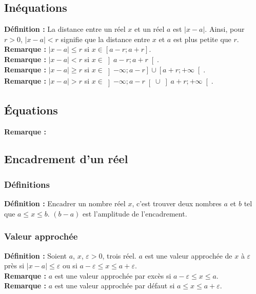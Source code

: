 \documentclass[a4paper,titlepage]{article}
\makeatletter
\def\tikzscale{1}\begin{lrbox}{\measure@tikzpicture}
\edef\tikzscale{\pgfmathresult}
\makeatother
\begin{document}
    \subsection{Inéquations}
        \textbf{Définition :} La distance entre un réel $x$ et un réel $a$ est $\left|x-a\right|$. Ainsi, pour $r>0$, $\left|x-a\right|<r$ signifie que la distance entre $x$ et $a$ est plus petite que $r$.
        \\
        \textbf{Remarque :} $\left|x-a\right|\leqslant r$ si $x\in\left[a-r;a+r\right]$.
        \\
        \textbf{Remarque :} $\left|x-a\right|<r$ si $x\in\left]a-r;a+r\right[$.
        \\
        \textbf{Remarque :} $\left|x-a\right|\geqslant r$ si $x\in\left]-\infty;a-r\right]\cup\left[a+r;+\infty\right[$.
        \\
        \textbf{Remarque :} $\left|x-a\right|>r$ si $x\in\left]-\infty;a-r\right[\cup\left]a+r;+\infty\right[$.
    \subsection{Équations}
        \textbf{Remarque :}\\
        \begin{scaletikzpicturetowidth}{\textwidth}
        \end{scaletikzpicturetowidth}
    \subsection{Encadrement d’un réel} 
        \subsubsection{Définitions}
            \textbf{Définition :} Encadrer un nombre réel $x$, c’est trouver deux nombres $a$ et $b$ tel que $a\leqslant x\leqslant b$. $\left(b-a\right)$ est l’amplitude de l’encadrement.
        \subsubsection{Valeur approchée}
            \textbf{Définition :} Soient $a$, $x$, $\varepsilon>0$, trois réel. $a$ est une valeur approchée de $x$ à $\varepsilon$ près si $\left|x-a\right|\leqslant\varepsilon$ ou si $a-\varepsilon\leqslant x\leqslant a+\varepsilon$.
            \\
            \textbf{Remarque :} $a$ est une valeur approchée par excès si $a-\varepsilon\leqslant x\leqslant a$.
            \\
            \textbf{Remarque :} $a$ est une valeur approchée par défaut si $a\leqslant x\leqslant a+\varepsilon$.
\end{document}
